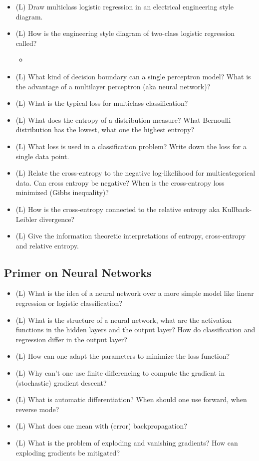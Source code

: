 \begin{itemize}
    \item (L) Draw multiclass logistic regression in an electrical engineering style diagram.
    \item (L) How is the engineering style diagram of two-class logistic regression called?
    \begin{itemize}
        \item {}
    \end{itemize}
    \item (L) What kind of decision boundary can a single perceptron model? What is the advantage
    of a multilayer perceptron (aka neural network)?
    \item (L) What is the typical loss for multiclass classification?
    \item (L) What does the entropy of a distribution measure? What Bernoulli distribution has the lowest, what one the highest entropy?
    \item (L) What loss is used in a classification problem? Write down the loss for a single data point.
    \item (L) Relate the cross-entropy to the negative log-likelihood for multicategorical data. Can cross entropy be negative? When is the 
    cross-entropy loss minimized (Gibbs inequality)?
    \item (L) How is the cross-entropy connected to the relative entropy aka Kullback-Leibler divergence?
    \item (L) Give the information theoretic interpretations of entropy, cross-entropy and relative entropy.
\end{itemize}

\subsection*{Primer on Neural Networks\skipthis}
\begin{itemize}
    \item (L) What is the idea of a neural network over a more simple model like linear regression or logistic classification?
    \item (L) What is the structure of a neural network, what are the activation functions in the hidden layers and the output layer?
    How do classification and regression differ in the output layer?
    \item (L) How can one adapt the parameters to minimize the loss function?
    \item (L) Why can't one use finite differencing to compute the gradient in (stochastic) gradient descent?
    \item (L) What is automatic differentiation? When should one use forward, when reverse mode?
    \item (L) What does one mean with (error) backpropagation?
    \item (L) What is the problem of exploding and vanishing gradients? How can exploding gradients be mitigated?
\end{itemize}


